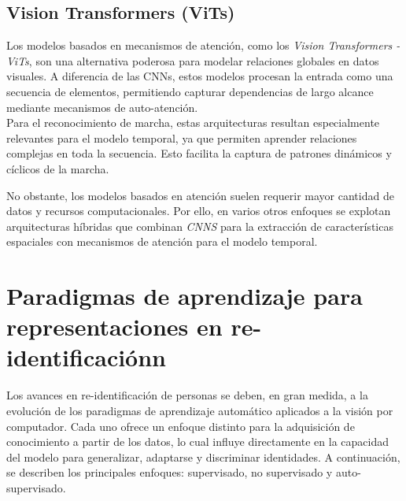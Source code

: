 \subsection{Vision Transformers (ViTs)}

Los modelos basados en mecanismos de atención, como los \textit{Vision Transformers - ViTs}, son una alternativa poderosa para modelar relaciones globales en datos visuales. A diferencia de las CNNs, estos modelos procesan la entrada como una secuencia de elementos, permitiendo capturar dependencias de largo alcance mediante mecanismos de auto-atención. \\
Para el reconocimiento de marcha, estas arquitecturas resultan especialmente relevantes para el modelo temporal, ya que permiten aprender relaciones complejas en toda la secuencia. Esto facilita la captura de patrones dinámicos y cíclicos de la marcha. 

No obstante, los modelos basados en atención suelen requerir mayor cantidad de datos y recursos computacionales. Por ello, en varios otros enfoques se explotan arquitecturas híbridas que combinan \textit{CNNS} para la extracción de características espaciales con mecanismos de atención para el modelo temporal.

\section{Paradigmas de aprendizaje para representaciones en re-identificaciónn}

Los avances en re-identificación de personas se deben, en gran medida, a la evolución de los paradigmas de aprendizaje automático aplicados a la visión por computador. Cada uno ofrece un enfoque distinto para la adquisición de conocimiento a partir de los datos, lo cual influye directamente en la capacidad del modelo para generalizar, adaptarse y discriminar identidades. A continuación, se describen los principales enfoques: supervisado, no supervisado y auto-supervisado.

